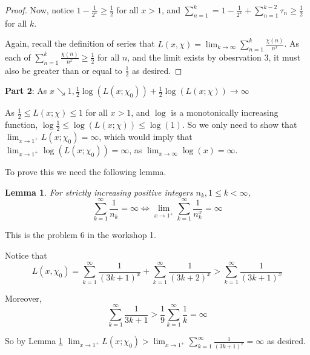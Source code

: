 \documentclass{article}
\newtheorem{lemma}[theorem]{Lemma}
\theoremstyle{definition}
\theoremstyle{definition}
\theoremstyle{remark}
\begin{document}
\begin{proof}
	Now, notice $1 - \frac{1}{2^x} \geq \frac{1}{2}$ for all $x > 1$, and $\sum_{n=1}^k = 1 - \frac{1}{2^x} + \sum_{n=1}^{k-2} \tau_n  \geq \frac{1}{2}$ for all $k$. 

	Again, recall the definition of series that $L(x, \chi) = \lim_{k \rightarrow \infty} \sum_{n=1}^{k}\frac{\chi(n)}{n^x}$. 
	As each of $ \sum_{n=1}^{k}\frac{\chi(n)}{n^x} \geq \frac{1}{2}$ for all $n$, and the limit exists by obesrvation 3, it must also be greater than or equal to $\frac{1}{2}$ as desired.
\end{proof}
	

{\large\textbf{Part 2}: As $x \searrow 1, \frac{1}{2} \log(L(x; \chi_0)) + \frac{1}{2}\log( L(x; \chi)) \rightarrow \infty$}

As $\frac{1}{2} \leq L(x; \chi) \leq 1$ for all $x > 1$, and $\log$ is a monotonically increasing function, $\log \frac{1}{2} \leq \log(L(x; \chi)) \leq \log(1)$. 
So we only need to show that $\lim_{x \rightarrow 1^+}L(x; \chi_0) = \infty$, which would imply that $\lim_{x \rightarrow 1^+}\log(L(x; \chi_0)) = \infty$, as $\lim_{x \rightarrow \infty}\log(x) = \infty$.

To prove this we need the following lemma. 

\begin{lemma}\label{Q6}
	For strictly increasing positive integers $n_k, 1 \leq k <  \infty$,
	\begin{equation}
		\sum_{k=1}^{\infty} \frac{1}{n_k} = \infty \iff \lim_{x \rightarrow 1^+} \sum_{k=1}^{\infty} \frac{1}{n_k^x} = \infty
	\end{equation}
\end{lemma}

This is the problem 6 in the workshop 1. 

Notice that
$$
L(x, \chi_0) = \sum_{k=1}^{\infty} \frac{1}{(3k+1)^x} + \sum_{k=1}^{\infty} \frac{1}{(3k+2)^x} >
\sum_{k=1}^{\infty} \frac{1}{(3k+1)^x}
$$

Moreover, 
$$
	\sum_{k=1}^{\infty} \frac{1}{3k+1} > \frac{1}{9}\sum_{k=1}^{\infty} \frac{1}{k} = \infty
$$

So by Lemma \ref{Q6} 
$\lim_{x \rightarrow 1^+} L(x; \chi_0) >
\lim_{x \rightarrow 1^+} \sum_{k=1}^{\infty} \frac{1}{(3k+1)^x} 
= \infty
$ as desired.
\end{document}
